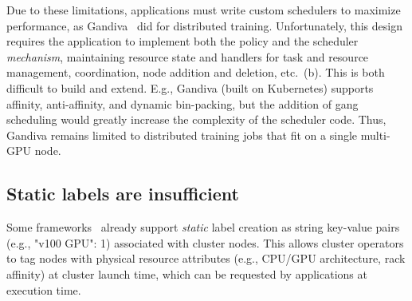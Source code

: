 Due to these limitations, applications must write custom schedulers to maximize performance, as Gandiva~\cite{gandiva} did for distributed training.
Unfortunately, this design requires the application to implement both the policy and the scheduler \emph{mechanism}, maintaining resource state and handlers for task and resource management, coordination, node addition and deletion, etc.~(b).
This is both difficult to build and extend.
E.g., Gandiva (built on Kubernetes) supports affinity, anti-affinity, and dynamic bin-packing, but the addition of gang scheduling would greatly increase the complexity of the scheduler code.
Thus, Gandiva remains limited to distributed training jobs that fit on a single multi-GPU node.


\subsection{Static labels are insufficient}
\label{sec:escher_motivation:label}
Some frameworks~\cite{mesos,omega,yarn,kubernetes} already support \emph{static} label creation as string key-value pairs (e.g., "v100 GPU": 1) associated with cluster nodes.
This allows cluster operators to tag nodes with physical resource attributes (e.g., CPU/GPU architecture, rack affinity) at cluster launch time, which can be requested by applications at execution time.

